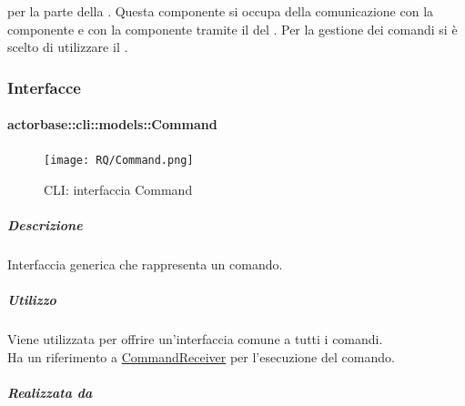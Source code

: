 \documentclass{scalatekids-article}
\begin{document}
 per la parte  della . Questa
componente si occupa della comunicazione con la componente  e
con la componente  tramite il  del  . Per la gestione dei comandi si è scelto di
utilizzare il .

\subsubsection{Interfacce}

\paragraph{actorbase::cli::models::Command}
\label{sec:actorbase::cli::models::Command}

\begin{figure}[H]
  \begin{center}
    \texttt{[image: RQ/Command.png]}
    \caption{CLI: interfaccia Command}
  \end{center}
\end{figure}

\subparagraph{Descrizione}

Interfaccia generica che rappresenta un comando.

\subparagraph{Utilizzo}

Viene utilizzata per offrire un'interfaccia comune a tutti i comandi.\\Ha un
riferimento a \hyperref[sec:actorbase::cli::models::CommandReceiver]{CommandReceiver} per l'esecuzione del
comando.

\subparagraph{Realizzata da}
\end{document}
